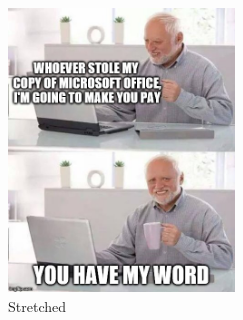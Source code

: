 \begin{figure}[h]
\centering
\includegraphics[width=6cm, height=0.9\textheight]{pic/04.jpg}
\caption{Stretched}
\end{figure}
